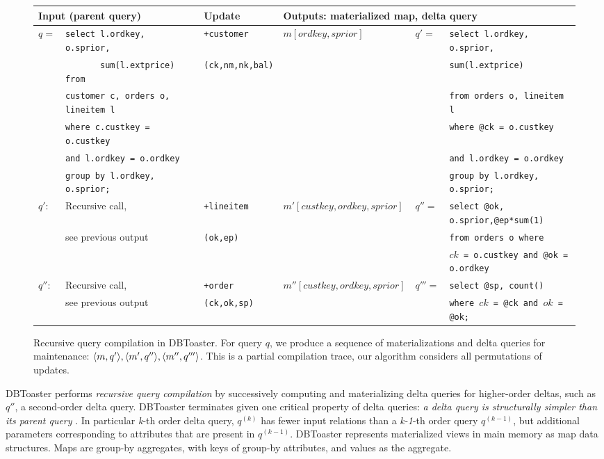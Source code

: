 \def \sql#1{{\scriptsize {\tt #1}}}
\begin{figure*}[htbp]

\vspace{-8mm}

\begin{tabular}{ll|l|l|ll}
\multicolumn{2}{l}{Input (parent query)}
& Update 
& \multicolumn{3}{l}{Outputs: materialized map, delta query}
\\
\hline
$q =$
& \sql{select l.ordkey, o.sprior,}
& \texttt{+customer}
& $m[ordkey,sprior]$
& $q' =$
& \sql{select l.ordkey, o.sprior,}
\\
& \sql{\ \ \ \ \ \ \ sum(l.extprice) from}
& \texttt{(ck,nm,nk,bal)}
& & & \sql{sum(l.extprice)}
\\
& \sql{customer c, orders o, lineitem l}
& & & & \sql{from orders o, lineitem l}
\\
& \sql{where c.custkey = o.custkey}
& & & & \sql{where @ck = o.custkey} 
\\
& \sql{and l.ordkey = o.ordkey}
& & & & \sql{and l.ordkey = o.ordkey}
\\
& \sql{group by l.ordkey, o.sprior;}
& & & & \sql{group by l.ordkey, o.sprior;}
\\
\hline
$q'$:
& Recursive call,
& \texttt{+lineitem} 
& $m'[custkey,ordkey,sprior]$
& $q'' =$ & \sql{select @ok, o.sprior,@ep*sum(1)}
\\
& see previous output
& \texttt{(ok,ep)} & & & \sql{from orders o where}
\\
& & & & & \sql{$ck$ = o.custkey and @ok = o.ordkey}
\\
\hline
$q''$:
& Recursive call,
& \texttt{+order} 
& $m''[custkey,ordkey,sprior]$
& $q'''=$ & \sql{select @sp, count()}
\\
& see previous output
& \texttt{(ck,ok,sp)}
& & & \sql{where $ck$ = @ck and $ok$ = @ok;}
\end{tabular}
\caption{Recursive query compilation in DBToaster. For query $q$, we produce a
sequence of materializations and delta queries for maintenance: ${\langle m,q'\rangle},
{\langle m',q''\rangle}, {\langle m'',q'''\rangle}$. This is a partial compilation trace, our
algorithm considers all permutations of updates.}
\label{fig:compex}
\vspace{-4mm}
\end{figure*}

DBToaster performs \textit{recursive query compilation} by successively
computing and materializing delta queries for higher-order deltas, such as
$q''$, a second-order delta query. DBToaster terminates given one critical
property of delta queries: \textit{a delta query is structurally simpler than its
parent query} \cite{koch-pods:10}. In particular \textit{k}-th order delta query, $q^{(k)}$ has fewer
input relations than a \textit{k-1}-th order query $q^{(k-1)}$, but additional
parameters corresponding to attributes that are present in $q^{(k-1)}$.
DBToaster represents materialized views in main memory as map data structures.
Maps are group-by aggregates, with keys of group-by attributes, and values as
the aggregate.

